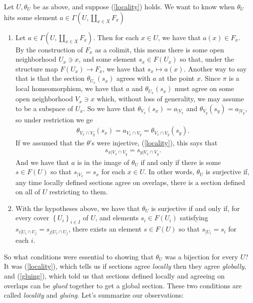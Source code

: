 \documentclass[11pt]{book}
\begin{document}
\begin{lemma}
\label{lem:theta-epimorphism}
Let $U,\theta_U$ be as above, and suppose (\ref{locality}) holds. We want to know when $\theta_U$ hits some element $a\in \Gamma(U,\amalg_{x\in X}F_x)$
\begin{enumerate}
    \item Let $a\in \Gamma(U,\amalg_{x\in X}F_x)$. Then for each $x\in U$, we have that $a(x) \in F_x$. By the construction of $F_x$ as a colimit, this means there is some open neighborhood $U_x \ni x$, and some element $s_x \in F(U_x)$ so that, under the structure map $F(U_x) \to F_x$, we have that $s_x \mapsto a(x)$. Another way to say that is that the section $\theta_{U_x}(s_x)$ agrees with $a$ at the point $x$. Since $\pi$ is a local homeomorphism, we have that $a$ and $\theta_{U_x}(s_x)$ must agree on some open neighborhood $V_x \ni x$ which, without loss of generality, we may assume to be a subspace of $U_x$. So we have that $\theta_{V_x}(s_x) = a_{|V_x}$ and $\theta_{V_y}(s_y) = a_{|V_y}$, so under restriction we ge
\begin{align*}
        \theta_{V_x \cap V_y}(s_x) = a_{V_x \cap V_y} =  \theta_{V_x\cap V_y}(s_y).
    \end{align*}
    If we assumed that the $\theta$'s were injective, (\ref{locality}), this says that
    \begin{align*}
        s_{x|V_x \cap V_y} = s_{y | V_x \cap V_y}.
    \end{align*}
    And we have that $a$ is in the image of $\theta_U$ if and only if there is some $s\in F(U)$ so that $s_{|V_x} = s_x$ for each $x\in U$. In other words, $\theta_U$ is surjective if, any time locally defined sections agree on overlaps, there is a section defined on all of $U$ restricting to them.
    \item\label{gluing} With the hypotheses above, we have that $\theta_U$ is surjective if and only if, for every cover $\left\{ U_i \right\}_{i\in I}$ of $U$, and elements $s_i \in F(U_i)$ satisfying $s_{i | U_i\cap U_j} = s_{j|U_i \cap U_j}$, there exists an element $s\in F(U)$ so that $s_{|U_i} = s_i$ for each $i$.
\end{enumerate}
\end{lemma}

So what conditions were essential to showing that $\theta_U$ was a bijection for every $U$? It was (\ref{locality}), which tells us if sections agree \emph{locally} then they agree \emph{globally}, and (\ref{gluing}), which told us that sections defined locally and agreeing on overlaps can be \emph{glued} together to get a global section. These two conditions are called \emph{locality} and \emph{gluing}. Let's summarize our observations:
\end{document}
